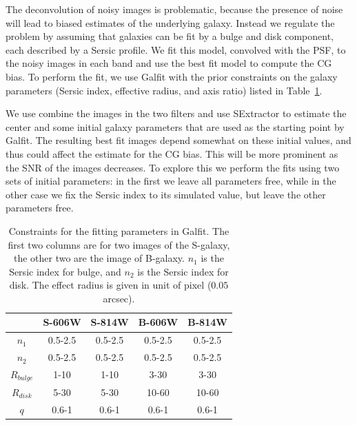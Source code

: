 \documentclass[useAMS,usenatbib]{mnras}
\begin{document}
The deconvolution of noisy images is problematic, because the presence of noise
will lead to biased estimates of the underlying galaxy. Instead we regulate the 
problem by assuming that galaxies can be fit by a bulge and disk component,
each described by a Sersic profile. We fit this model, convolved with the PSF, to 
the noisy images in each band and use the best fit model to compute the CG bias. 
To perform the fit, we use {\sc Galfit} \citep{2010AJ....139.2097P} with 
the prior constraints on the galaxy parameters (Sersic index, effective radius,
and axis ratio) listed in Table~\ref{fitpar}.

%
%

We use combine the images in the two filters and use {\sc SExtractor}
to estimate the center and some initial galaxy parameters that are used
as the starting point by {\sc Galfit}. The resulting best fit images
depend somewhat on these initial values, and thus could affect the 
estimate for the CG bias. This will be more prominent as the SNR of
the images decreases. To explore this we perform the fits using two
sets of initial parameters: in the first we leave all parameters free,
while in the other case we fix the Sersic index to its simulated value,
but leave the other parameters free.


\begin{center}
\begin{table}
\begin{tabular}{|c|c|c|c|c|}
\hline\hline
 &S-606W  & S-814W  & B-606W & B-814W \\ \hline
$n_1$ &0.5-2.5  &0.5-2.5  &0.5-2.5 &0.5-2.5 \\ \hline
$n_2$ &0.5-2.5  &0.5-2.5  &0.5-2.5 &0.5-2.5 \\ \hline
$R_{bulge}$ &1-10 &1-10  &3-30  &3-30  \\ \hline
$R_{disk}$  &5-30 &5-30  &10-60 &10-60 \\ \hline
$q$      &0.6-1  &0.6-1  &0.6-1 &0.6-1 \\ \hline
\hline
\end{tabular}
\caption{\label{fitpar} Constraints for the fitting parameters in Galfit.
The first two columns are for two images of the S-galaxy, the other two are
the image of B-galaxy.
$n_1$ is the Sersic index for bulge, and $n_2$ is the Sersic index for disk.
The effect radius is given in unit of pixel ($0.05$ arcsec).}
\end{table}
\end{center}
%
\end{document}
